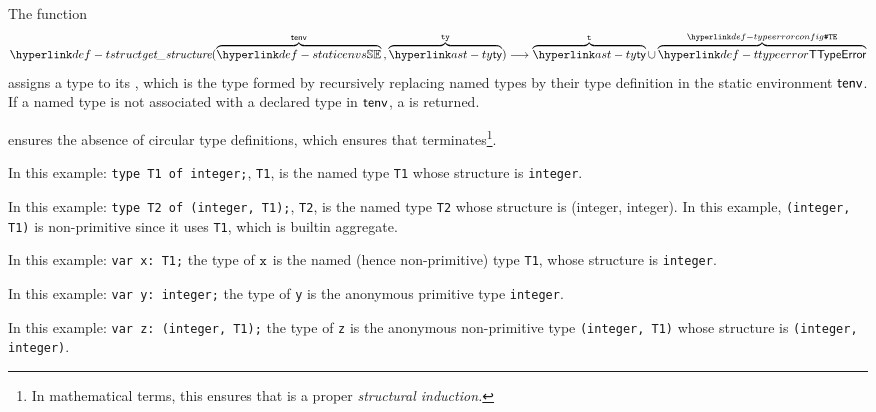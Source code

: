 \hypertarget{def-structure}{}
The function
\[
  \tstruct(\overname{\staticenvs}{\tenv} \aslsep \overname{\ty}{\tty}) \aslto \overname{\ty}{\vt} \cup \overname{\TTypeError}{\TypeErrorConfig}
\]
assigns a type to its \hypertarget{def-tstruct}{\emph{\structure}}, which is the type formed by
recursively replacing named types by their type definition in the static environment $\textsf{tenv}$.
If a named type is not associated with a declared type in $\textsf{tenv}$, a \typingerrorterm{} is returned.

 ensures the absence of circular type definitions,
which ensures that  terminates\footnote{In mathematical terms,
this ensures that  is a proper \emph{structural induction.}}.

In this example:
\texttt{type T1 of integer;}, \texttt{T1}, is the named type \texttt{T1}
whose structure is \texttt{integer}.

In this example:
\texttt{type T2 of (integer, T1);}, \texttt{T2},
is the named type \texttt{T2} whose structure is (integer, integer). In this
example, \texttt{(integer, T1)} is non-primitive since it uses \texttt{T1}, which is builtin aggregate.

In this example:
\texttt{var x: T1;}
the type of $\texttt{x}$ is the named (hence non-primitive) type \texttt{T1}, whose structure
is \texttt{integer}.

In this example:
\texttt{var y: integer;}
the type of \texttt{y} is the anonymous primitive type \texttt{integer}.

In this example:
\texttt{var z: (integer, T1);}
the type of \texttt{z} is the anonymous non-primitive type
\texttt{(integer, T1)} whose structure is \texttt{(integer, integer)}.

